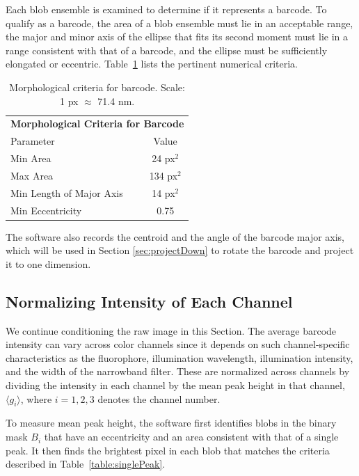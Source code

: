 Each blob ensemble is examined to determine if it represents a barcode. To qualify as a barcode, the area of a blob ensemble must lie in an acceptable range, the major and minor axis of the ellipse that fits its second moment must lie in a range consistent with that of a barcode, and the ellipse must be sufficiently elongated or eccentric. Table~\ref{table:morphCriteria} lists the pertinent numerical criteria. 

\begin{table}[htbp] 
\begin{center}
\begin{tabular}{l c}
\multicolumn{2}{c}{\textbf{Morphological Criteria for Barcode}}\\
Parameter & Value \\
\hline
Min Area & 24 px$^2$ \\
Max Area & 134 px$^2$ \\
Min Length of Major Axis  & 14 px$^2$ \\
Min Eccentricity &0.75\\
\hline
\end{tabular}
\end{center}
\caption{Morphological criteria for barcode. Scale: 1 px $\approx$ 71.4 nm.\label{table:morphCriteria}}
\end{table}
The software also records the centroid and the angle of the barcode major axis, which will be used in Section \ref{sec:projectDown} to rotate the barcode and project it to one dimension. 

\subsection{Normalizing Intensity of Each Channel}\label{sec:normalizePeakHeight}
We continue conditioning the raw image in this Section. The average barcode intensity can vary across color channels since it depends on such channel-specific characteristics as the fluorophore, illumination wavelength, illumination intensity, and the width of the narrowband filter. These are normalized across channels by dividing the intensity in each channel by the mean peak height in that channel,  $\langle g_i \rangle$, where $i=1,2,3$ denotes the channel number. 

To measure mean peak height, the software first identifies blobs in the binary mask $B_i$ that have an eccentricity and an area consistent with that of a single peak. It then finds the brightest pixel in each blob that matches the criteria described in Table~\ref{table:singlePeak}.

